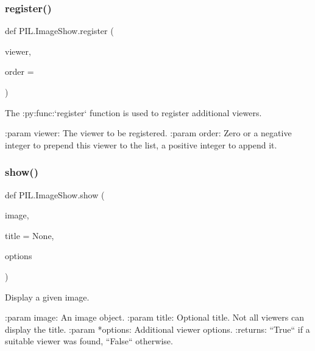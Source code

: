 \subsubsection{\texorpdfstring{register()}{register()}}
{\footnotesize\ttfamily def P\+I\+L.\+Image\+Show.\+register (\begin{DoxyParamCaption}\item[{}]{viewer,  }\item[{}]{order = {} }\end{DoxyParamCaption})}

\begin{DoxyVerb}The :py:func:`register` function is used to register additional viewers.

:param viewer: The viewer to be registered.
:param order:
    Zero or a negative integer to prepend this viewer to the list,
    a positive integer to append it.
\end{DoxyVerb}
 \mbox{\label{namespacePIL_1_1ImageShow_a746ccb433ccf0b7865ccdd8c1b6e82b5}} 
\subsubsection{\texorpdfstring{show()}{show()}}
{\footnotesize\ttfamily def P\+I\+L.\+Image\+Show.\+show (\begin{DoxyParamCaption}\item[{}]{image,  }\item[{}]{title = {\ttfamily None},  }\item[{}]{options }\end{DoxyParamCaption})}

\begin{DoxyVerb}Display a given image.

:param image: An image object.
:param title: Optional title. Not all viewers can display the title.
:param \**options: Additional viewer options.
:returns: ``True`` if a suitable viewer was found, ``False`` otherwise.
\end{DoxyVerb}
 